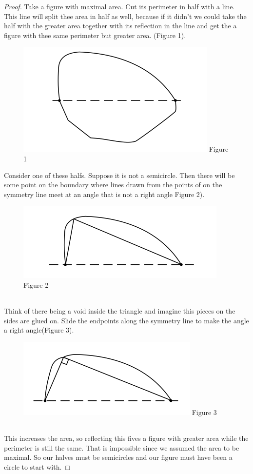 \documentclass[12pt, a4paper, titlepage]{article}
\begin{document}
\begin{proof}
Take a figure with maximal area. Cut its perimeter in half with a line. This line will split thee area in half as well, because if it didn't we could take the half with the greater area together with its reflection in the line and get the a figure with thee same perimeter but greater area. (Figure 1).\\
\begin{figure}[h]
\includegraphics[scale=0.5]{images/Figure1}
\centering
Figure 1
\centering
\end{figure}

Consider one of these halfs. Suppose it is not a semicircle. Then there will be some point on the boundary where lines drawn from the points of on the symmetry line meet at an angle that is not a right angle Figure 2).\\
\begin{figure}[h]
\includegraphics[scale=0.5]{images/Figure2}
\centering
Figure 2
\centering
\end{figure}
\\
Think of there being a void inside the triangle and imagine this pieces on the sides are glued on. Slide the endpoints along the symmetry line to make the angle a right angle(Figure 3).\\
\begin{figure}[h]
\includegraphics[scale=0.5]{images/Figure3}
\centering
Figure 3
\centering
\end{figure}
\\
This increases the area, so reflecting this fives a figure with greater area while the perimeter is still the same. That is impossible since we assumed the area to be maximal. So our halves must be semicircles and our figure must have been a circle to start with.
\end{proof}
\end{document}
